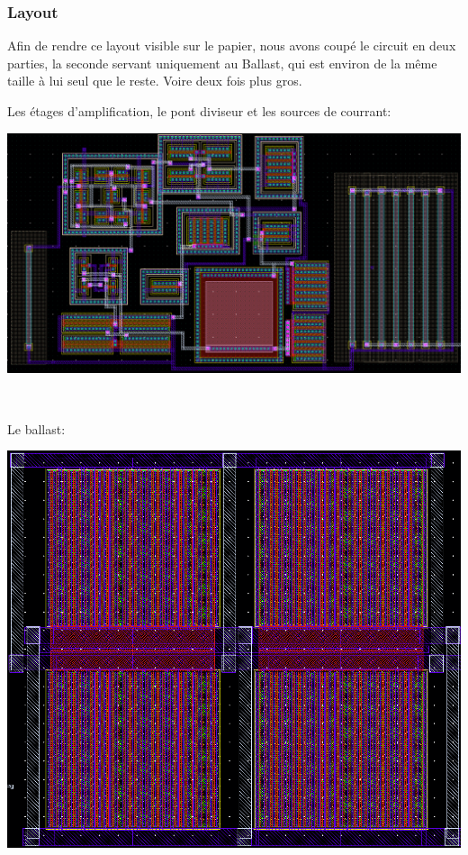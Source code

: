 \documentclass{article}
\begin{document}
\newpage

\subsubsection{Layout}

Afin de rendre ce layout visible sur le papier, nous avons coupé le circuit en deux parties, la seconde servant uniquement au Ballast, qui est environ de la même taille à lui seul que le reste. Voire deux fois plus gros.

Les étages d’amplification, le pont diviseur et les sources de courrant:

\includegraphics[width=\linewidth-1cm]{layout_g.png}

~

Le ballast:

\includegraphics[width=\linewidth-1cm]{layout_d.png}
\end{document}
